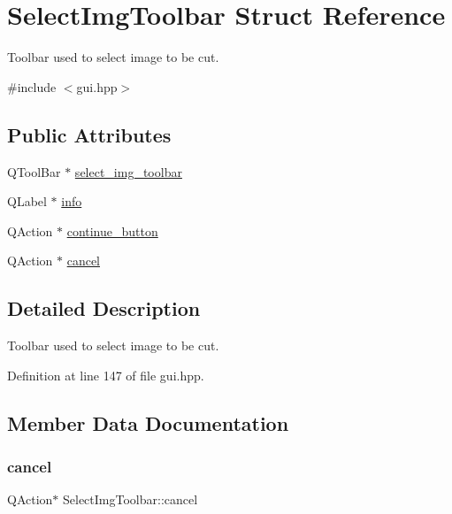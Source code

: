 \hypertarget{structSelectImgToolbar}{}\section{Select\+Img\+Toolbar Struct Reference}
\label{structSelectImgToolbar}


Toolbar used to select image to be cut.  




{\ttfamily \#include $<$gui.\+hpp$>$}

\subsection*{Public Attributes}
\begin{DoxyCompactItemize}
\item 
Q\+Tool\+Bar $\ast$ \mbox{\hyperlink{structSelectImgToolbar_a779bc326cf08c9fbcd1ffebb43a664eb}{select\+\_\+img\+\_\+toolbar}}
\item 
Q\+Label $\ast$ \mbox{\hyperlink{structSelectImgToolbar_a3cf6ac92fbe60877873c89939217e1de}{info}}
\item 
Q\+Action $\ast$ \mbox{\hyperlink{structSelectImgToolbar_a82569764f9d7e13b406a668e9e50290a}{continue\+\_\+button}}
\item 
Q\+Action $\ast$ \mbox{\hyperlink{structSelectImgToolbar_a0b17a222dff0441c0f10509315ce9052}{cancel}}
\end{DoxyCompactItemize}


\subsection{Detailed Description}
Toolbar used to select image to be cut. 

Definition at line 147 of file gui.\+hpp.



\subsection{Member Data Documentation}
\mbox{\label{structSelectImgToolbar_a0b17a222dff0441c0f10509315ce9052}} 
\subsubsection{\texorpdfstring{cancel}{cancel}}
{\footnotesize\ttfamily Q\+Action$\ast$ Select\+Img\+Toolbar\+::cancel}

